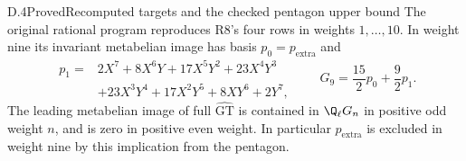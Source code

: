 \begin{statement}{D.4}{Proved}{Recomputed targets and the checked pentagon upper bound}
The original rational program reproduces R8's four rows in weights
$1,\ldots,10$. In weight nine its invariant metabelian image has basis
$p_0=p_{\mathrm{extra}}$ and
\[
\begin{split}
 p_1={}&2X^7+8X^6Y+17X^5Y^2+23X^4Y^3\\
       &+23X^3Y^4+17X^2Y^5+8XY^6+2Y^7,
\end{split}
\qquad G_9=\frac{15}{2}p_0+\frac92p_1.
\]
The leading metabelian image of full $\widehat{\mathrm{GT}}$ is contained
in $\Q_\ell G_n$ in positive odd weight $n$, and is zero in positive
even weight. In particular $p_{\mathrm{extra}}$ is excluded in weight
nine by this implication from the pentagon.
\end{statement}
